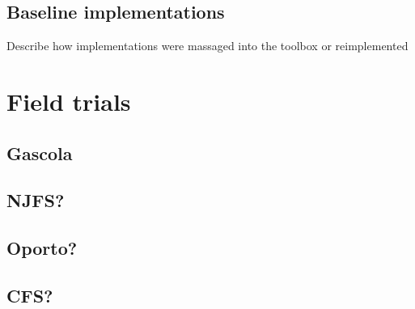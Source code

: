 \subsection{Baseline implementations}
Describe how implementations were massaged into the toolbox or reimplemented

\section{Field trials}
\subsection{Gascola}
\subsection{NJFS?}
\subsection{Oporto?}
\subsection{CFS?}
